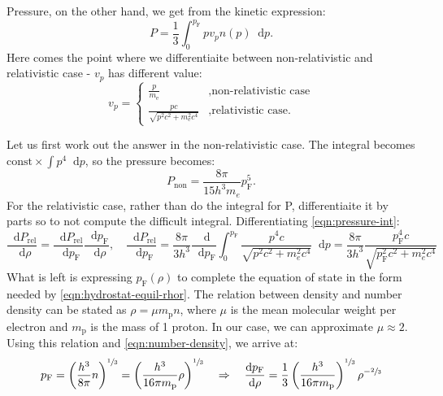 \documentclass[]{article}
\newcommand{\dd}{\mathop{}\!\mathrm{d}}
\begin{document}
	Pressure, on the other hand, we get from the kinetic expression:
	\begin{equation}\label{eqn:pressure-int}
		P = \frac{1}{3} \int_0^{p_\mathrm{F}} p v_p n(p) \dd p.
	\end{equation}
	Here comes the point where we differentiaite between non-relativistic and relativistic case - $v_p$ has different value:
	\begin{equation}
		v_p = \begin{cases}
			\frac{p}{m_\mathrm{e}} &, \text{non-relativistic case} \\
			\frac{pc}{\sqrt{p^2c^2 + m_\mathrm{e}^2 c^4}} &, \text{relativistic case.}
		\end{cases}
	\end{equation}

	Let us first work out the answer in the non-relativistic case. The integral becomes $\text{const} \times \int p^4 \dd p$, so the pressure becomes:
	\begin{equation}
		P_\mathrm{non} = \frac{8 \pi}{15 h^3 m_e} p_\mathrm{F}^5.
	\end{equation}
	For the relativistic case, rather than do the integral for P, differentiaite it by parts so to not compute the difficult integral. Differentiating \eqref{eqn:pressure-int}:
	\begin{equation}
		\frac{\dd P_\mathrm{rel}}{\dd \rho} = \frac{\dd P_\mathrm{rel}}{\dd p_\mathrm{F}} \frac{\dd p_\mathrm{F}}{\dd \rho}, \quad \frac{\dd P_\mathrm{rel}}{\dd p_\mathrm{F}} = \frac{8\pi}{3h^3}\frac{\dd}{\dd p_\mathrm{F}}\int_0^{p_\mathrm{F}} \frac{p^4 c}{\sqrt{p^2c^2 + m_e^2 c^4}} \dd p = \frac{8\pi}{3h^3} \frac{p_\mathrm{F}^4 c}{\sqrt{p_\mathrm{F}^2c^2 + m_e^2 c^4}}
	\end{equation}
	What is left is expressing $p_\mathrm{F} (\rho)$ to complete the equation of state in the form needed by \eqref{eqn:hydrostat-equil-rhor}. The relation between density and number density can be stated as $\rho = \mu m_\mathrm{p} n$, where $\mu$ is the mean molecular weight per electron and $m_\mathrm{p}$ is the mass of 1 proton. In our case, we can approximate $\mu \approx 2$. Using this relation and \eqref{eqn:number-density}, we arrive at:
	\begin{equation}
		p_\mathrm{F} = \left( \frac{h^3}{8 \pi} n \right)^{\sfrac{1}{3}} = \left( \frac{h^3}{16 \pi m_\mathrm{p}} \rho\right)^{\sfrac{1}{3}} \quad \Rightarrow \quad \frac{\dd p_\mathrm{F}}{\dd \rho} = \frac{1}{3} \left( \frac{h^3}{16 \pi m_\mathrm{p}}\right)^{\sfrac{1}{3}} \rho^{-\sfrac{2}{3}}
	\end{equation}
\end{document}
